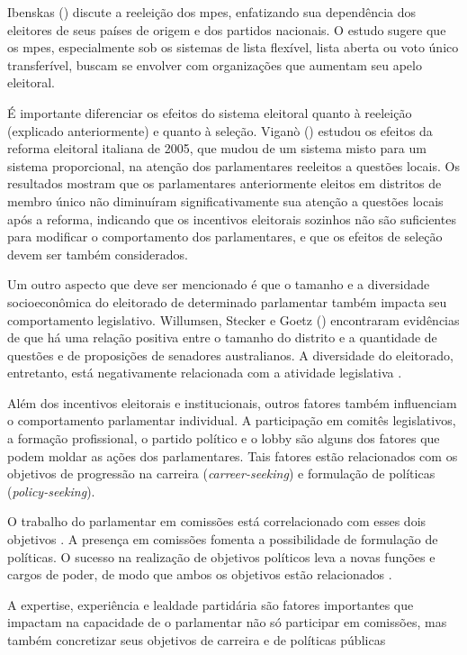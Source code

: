 Ibenskas (\citeyear{Ibenskas2021}) discute a reeleição dos \acrshort{mpe}s, enfatizando sua dependência dos eleitores de seus países de origem e dos partidos nacionais. O estudo sugere que os \acrshort{mpe}s, especialmente sob os sistemas de lista flexível, lista aberta ou voto único transferível, buscam se envolver com organizações que aumentam seu apelo eleitoral.

É importante diferenciar os efeitos do sistema eleitoral quanto à reeleição (explicado anteriormente) e quanto à seleção. Viganò (\citeyear{vigano2024electoral}) estudou os efeitos da reforma eleitoral italiana de 2005, que mudou de um sistema misto para um sistema proporcional, na atenção dos parlamentares reeleitos a questões locais. Os resultados mostram que os parlamentares anteriormente eleitos em distritos de membro único não diminuíram significativamente sua atenção a questões locais após a reforma, indicando que os incentivos eleitorais sozinhos não são suficientes para modificar o comportamento dos parlamentares, e que os efeitos de seleção devem ser também considerados.

Um outro aspecto que deve ser mencionado é que o tamanho e a diversidade socioeconômica do eleitorado de determinado parlamentar também impacta seu comportamento legislativo. Willumsen, Stecker e Goetz (\citeyear{willumsen_electoral_2019}) encontraram evidências de que há uma relação positiva entre o tamanho do distrito e a quantidade de questões e de proposições de senadores australianos. A diversidade do eleitorado, entretanto, está negativamente relacionada com a atividade legislativa \cite{willumsen_electoral_2019}.

Além dos incentivos eleitorais e institucionais, outros fatores também influenciam o comportamento parlamentar individual. A participação em comitês legislativos, a formação profissional, o partido político e o lobby são alguns dos fatores que podem moldar as ações dos parlamentares. Tais fatores estão relacionados com os objetivos de progressão na carreira (\textit{carreer-seeking}) e formulação de políticas (\textit{policy-seeking}).

O trabalho do parlamentar em comissões está correlacionado com esses dois objetivos \cite{daniel2015career}. A presença em comissões fomenta a possibilidade de formulação de políticas. O sucesso na realização de objetivos políticos leva a novas funções e cargos de poder, de modo que ambos os objetivos estão relacionados \cite{daniel2015career}. 

A expertise, experiência e lealdade partidária são fatores importantes que impactam na capacidade de o parlamentar não só participar em comissões, mas também concretizar seus objetivos de carreira e de políticas públicas \cite{chiru2020loyal}

